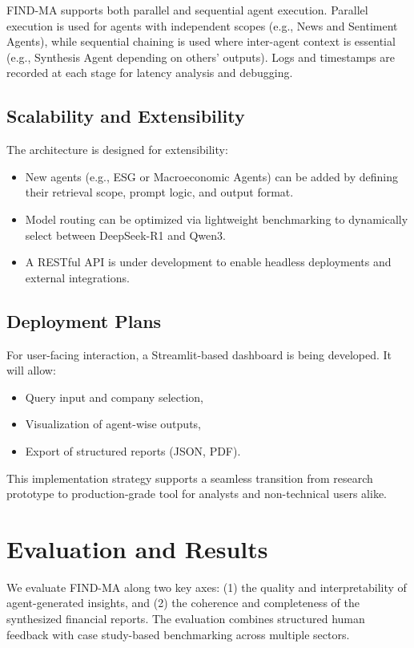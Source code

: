 \documentclass[11pt]{article}
\begin{document}
FIND-MA supports both parallel and sequential agent execution. Parallel execution is used for agents with independent scopes (e.g., News and Sentiment Agents), while sequential chaining is used where inter-agent context is essential (e.g., Synthesis Agent depending on others’ outputs). Logs and timestamps are recorded at each stage for latency analysis and debugging.

\subsection*{Scalability and Extensibility}

The architecture is designed for extensibility:

\begin{itemize}
    \item New agents (e.g., ESG or Macroeconomic Agents) can be added by defining their retrieval scope, prompt logic, and output format.
    \item Model routing can be optimized via lightweight benchmarking to dynamically select between DeepSeek-R1 and Qwen3.
    \item A RESTful API is under development to enable headless deployments and external integrations.
\end{itemize}

\subsection*{Deployment Plans}

For user-facing interaction, a Streamlit-based dashboard is being developed. It will allow:
\begin{itemize}
    \item Query input and company selection,
    \item Visualization of agent-wise outputs,
    \item Export of structured reports (JSON, PDF).
\end{itemize}

This implementation strategy supports a seamless transition from research prototype to production-grade tool for analysts and non-technical users alike.


\section{Evaluation and Results}
\label{sec:evaluation}

We evaluate FIND-MA along two key axes: (1) the quality and interpretability of agent-generated insights, and (2) the coherence and completeness of the synthesized financial reports. The evaluation combines structured human feedback with case study-based benchmarking across multiple sectors.
\end{document}
